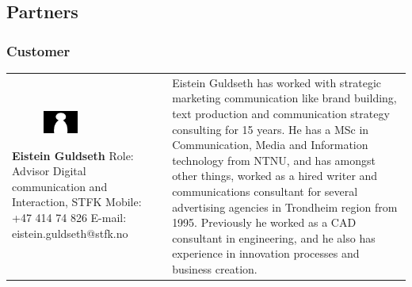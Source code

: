 \documentclass[11pt]{book}
\begin{document}
\subsection{Partners}
\subsubsection{Customer}
\begin{table}[H]
\centering
\begin{tabular}{ p{7cm} p{7cm} }
\parbox{7cm}{
\begin{figure}[H]
      \includegraphics[width=0.4\textwidth]{Figures/Person.png}
      \label{fig:partners_customer_eistein}
\end{figure}
\textbf{Eistein Guldseth}\\
Role: Advisor Digital communication and Interaction, STFK\\
Mobile: +47 414 74 826\\
E-mail: eistein.guldseth@stfk.no} & \parbox{7cm}{
Eistein Guldseth has worked with strategic marketing communication like brand building, text production and communication strategy consulting for 15 years. He has a MSc in Communication, Media and Information technology from NTNU, and has amongst other things, worked as a hired writer and communications consultant for several advertising agencies in Trondheim region from 1995. Previously he worked as a CAD consultant in engineering, and he also has experience in innovation processes and business creation.\cite{bioEisteinGuldseth}
}
\end{tabular}
\label{tab:partners_customer_eistein}
\end{table}
\end{document}
